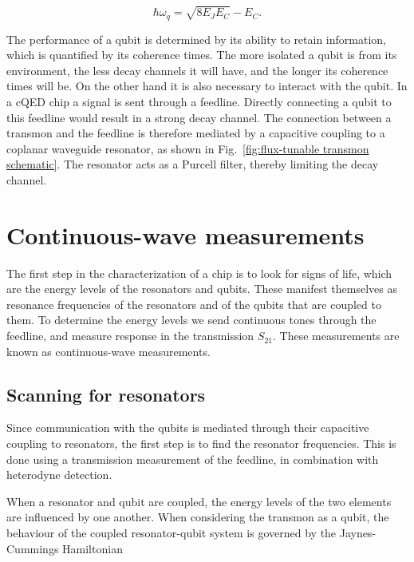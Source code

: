      \begin{equation}
        \hbar \omega_q = \sqrt{8 E_J E_C} - E_C.
        \label{eq:transmon frequency}
      \end{equation}

      The performance of a qubit is determined by its ability to retain information, which is quantified by its coherence times. The more isolated a qubit is from its environment, the less decay channels it will have, and the longer its coherence times will be. On the other hand it is also necessary to interact with the qubit. In a cQED chip a signal is sent through a feedline. Directly connecting a qubit to this feedline would result in a strong decay channel. The connection between a transmon and the feedline is therefore mediated by a capacitive coupling to a coplanar waveguide resonator, as shown in Fig.~\ref{fig:flux-tunable transmon schematic}. The resonator acts as a Purcell filter, thereby limiting the decay channel.

    \section{Continuous-wave measurements}
      \label{sec:Continuous-wave measurements}
      The first step in the characterization of a chip is to look for signs of life, which are the energy levels of the resonators and qubits. These manifest themselves as resonance frequencies of the resonators and of the qubits that are coupled to them. To determine the energy levels we send continuous tones through the feedline, and measure response in the transmission $S_{21}$. These measurements are known as continuous-wave measurements.

      \subsection{Scanning for resonators}
        \label{sec:resonator-scan}
        Since communication with the qubits is mediated through their capacitive coupling to resonators, the first step is to find the resonator frequencies. This is done using a transmission measurement of the feedline, in combination with heterodyne detection.

        When a resonator and qubit are coupled, the energy levels of the two elements are influenced by one another. When considering the transmon as a qubit, the behaviour of the coupled resonator-qubit system is governed by the Jaynes-Cummings Hamiltonian \cite{koch2007Transmon}

